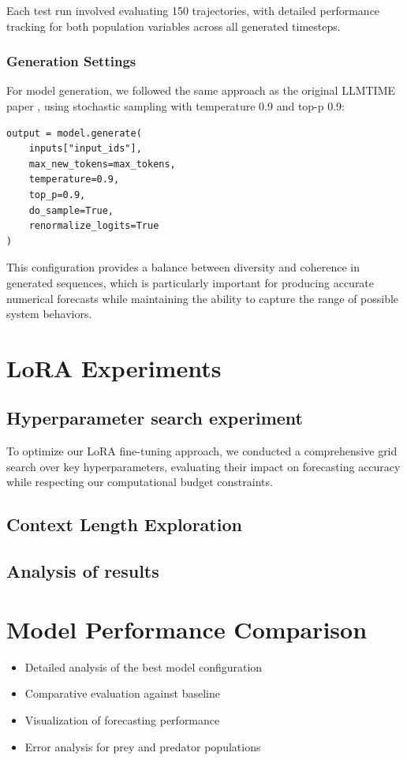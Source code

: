 \documentclass{article}
\begin{document}
Each test run involved evaluating 150 trajectories, with detailed performance tracking for both population variables across all generated timesteps.
\subsubsection*{Generation Settings}

For model generation, we followed the same approach as the original LLMTIME paper \cite{gruver2023large}, using stochastic sampling with temperature 0.9 and top-p 0.9:

\begin{verbatim}
output = model.generate(
    inputs["input_ids"],
    max_new_tokens=max_tokens,
    temperature=0.9,
    top_p=0.9,
    do_sample=True,
    renormalize_logits=True
)
\end{verbatim}

This configuration provides a balance between diversity and coherence in generated sequences, which is particularly important for producing accurate numerical forecasts while maintaining the ability to capture the range of possible system behaviors.
\section*{LoRA Experiments}
\subsection*{Hyperparameter search experiment}
To optimize our LoRA fine-tuning approach, we conducted a comprehensive grid search over key hyperparameters, evaluating their impact on forecasting accuracy while respecting our computational budget constraints.


\subsection*{Context Length Exploration}
\subsection*{Analysis of results}

\section*{Model Performance Comparison}

\begin{itemize}
    \item Detailed analysis of the best model configuration
   \item  Comparative evaluation against baseline
   \item  Visualization of forecasting performance
   \item Error analysis for prey and predator populations
\end{itemize}
\end{document}
